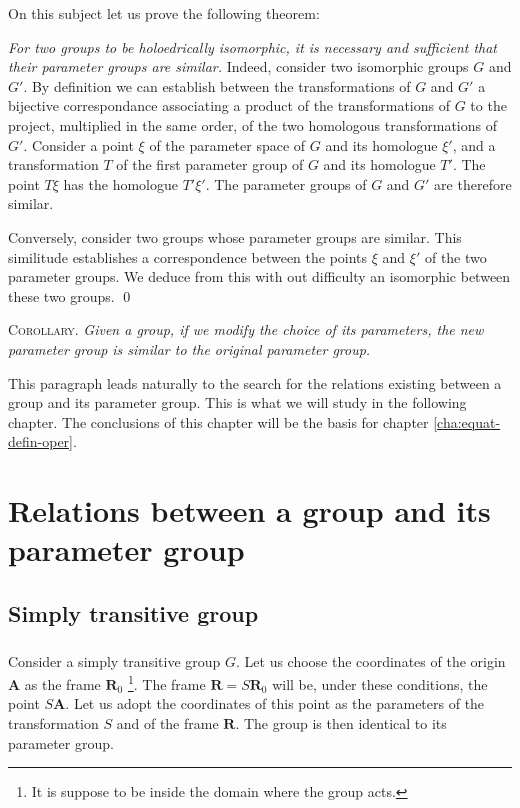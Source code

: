 On this subject let us prove the following theorem:

\somespace

\emph{For two groups to be holoedrically isomorphic, it is necessary and sufficient that their parameter groups are similar.} Indeed, consider two isomorphic groups $G$ and $G'$. By definition we can establish between the transformations of $G$ and $G'$ a bijective correspondance associating a product of the transformations of $G$ to the project, multiplied in the same order, of the two homologous transformations of $G'$. Consider a point $\xi$ of the parameter space of $G$ and its homologue $\xi'$, and a transformation $T$ of the first parameter group of $G$ and its homologue $T'$. The point $T\xi$ has the homologue $T'\xi'$. The parameter groups of $G$ and $G'$ are therefore similar.

Conversely, consider two groups whose parameter groups are similar. This similitude establishes a correspondence between the points $\xi$ and $\xi'$ of the two parameter groups. We deduce from this with out difficulty an isomorphic between these two groups.
\qed

\somespace

\textsc{Corollary.} \emph{Given a group, if we modify the choice of its parameters, the new parameter group is similar to the original parameter group.}

\somespace

This paragraph leads naturally to the search for the relations existing between a group and its parameter group. This is what we will study in the following chapter. The conclusions of this chapter will be the basis for chapter \ref{cha:equat-defin-oper}.

\chapter{Relations between a group and its parameter group}
\label{cha:relat-betw-group}

\section{Simply transitive group}
\label{sec:simply-trans-group}

\paragraph{}
\label{sec:99}
Consider a simply transitive group $G$. Let us choose the coordinates of the origin $\mathbf{A}$ as the frame $\mathbf{R}_{0}$ \footnote{It is suppose to be inside the domain where the group acts.}. The frame $\mathbf{R}=S\mathbf{R}_{0}$ will be, under these conditions, the point $S\mathbf{A}$. Let us adopt the coordinates of this point as the parameters of the transformation $S$ and of the frame $\mathbf{R}$. The group is then identical to its parameter group.

